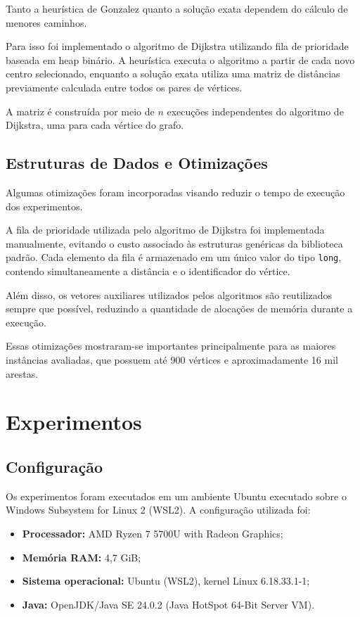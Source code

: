 \documentclass[12pt]{article}
\begin{document}
Tanto a heurística de Gonzalez quanto a solução exata dependem do cálculo de menores caminhos.

Para isso foi implementado o algoritmo de Dijkstra utilizando fila de prioridade baseada em heap binário. A heurística executa o algoritmo a partir de cada novo centro selecionado, enquanto a solução exata utiliza uma matriz de distâncias previamente calculada entre todos os pares de vértices.

A matriz é construída por meio de $n$ execuções independentes do algoritmo de Dijkstra, uma para cada vértice do grafo.

\subsection{Estruturas de Dados e Otimizações}

Algumas otimizações foram incorporadas visando reduzir o tempo de execução dos experimentos.

A fila de prioridade utilizada pelo algoritmo de Dijkstra foi implementada manualmente, evitando o custo associado às estruturas genéricas da biblioteca padrão. Cada elemento da fila é armazenado em um único valor do tipo \texttt{long}, contendo simultaneamente a distância e o identificador do vértice.

Além disso, os vetores auxiliares utilizados pelos algoritmos são reutilizados sempre que possível, reduzindo a quantidade de alocações de memória durante a execução.

Essas otimizações mostraram-se importantes principalmente para as maiores instâncias avaliadas, que possuem até 900 vértices e aproximadamente 16 mil arestas.

\section{Experimentos}

\subsection{Configuração}

Os experimentos foram executados em um ambiente Ubuntu executado sobre o Windows Subsystem for Linux 2 (WSL2). A configuração utilizada foi:

\begin{itemize}
    \item \textbf{Processador:} AMD Ryzen 7 5700U with Radeon Graphics;
    \item \textbf{Memória RAM:} 4,7 GiB;
    \item \textbf{Sistema operacional:} Ubuntu (WSL2), kernel Linux 6.18.33.1-1;
    \item \textbf{Java:} OpenJDK/Java SE 24.0.2 (Java HotSpot 64-Bit Server VM).
\end{itemize}
\end{document}
